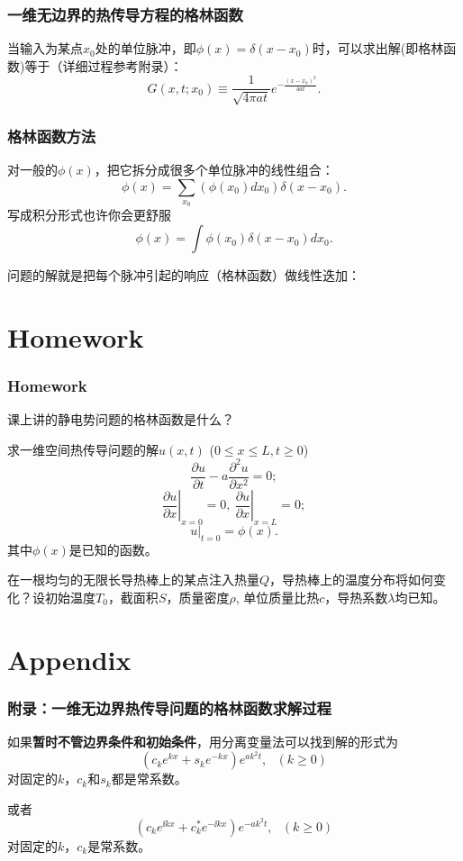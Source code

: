 \documentclass[CJK]{beamer}
\begin{document}
\begin{frame}
  \frametitle{ 一维无边界的热传导方程的格林函数}
  
  当输入为某点$x_0$处的单位脉冲，即$\phi(x) = \delta(x-x_0)$时，可以求出解(即格林函数)等于（详细过程参考附录）：
  $$ G(x, t; x_0)  \equiv \frac{1}{\sqrt{4\pi at}} e^{-\frac{(x-x_0)^2}{4at}}. $$
\end{frame}



\begin{frame}
  \frametitle{格林函数方法}

  对一般的$\phi(x)$，把它拆分成很多个单位脉冲的线性组合：
  $$ \phi(x) = \sum_{x_0} (\phi(x_0)dx_0)  \delta(x-x_0). $$
  写成积分形式也许你会更舒服
  $$\phi(x) = \int \phi(x_0) \delta(x-x_0) dx_0. $$

  问题的解就是把每个脉冲引起的响应（格林函数）做线性迭加：  
  
\end{frame}




\section{Homework}

\begin{frame}
  \frametitle{Homework}
  \bitem
\item{课上讲的静电势问题的格林函数是什么？}
\item{求一维空间热传导问题的解$u(x,t)$ ($0\le x\le L, t\ge 0$)
  $$ \frac{\partial u}{\partial t} - a\frac{\partial^2u}{\partial x^2} = 0;$$
  $$ \left.\frac{\partial u}{\partial x}\right\vert_{x=0} = 0,\ \left.\frac{\partial u}{\partial x}\right\vert_{x=L}=0; $$
  $$ \left.u\right\vert_{t=0} = \phi(x). $$
  其中$\phi(x)$是已知的函数。}
\item{在一根均匀的无限长导热棒上的某点注入热量$Q$，导热棒上的温度分布将如何变化？设初始温度$T_0$，截面积$S$，质量密度$\rho$, 单位质量比热$c$，导热系数$\lambda$均已知。}
  \eitem
\end{frame}

\section{Appendix}

\begin{frame}
  \frametitle{附录：一维无边界热传导问题的格林函数求解过程}
  
  如果{\bf 暂时不管边界条件和初始条件}，用分离变量法可以找到解的形式为
  \begin{equation}
    \left(c_k e^{k x} + s_k e^{-k x}\right) e^{ak^2t},\ \ \ (k\ge 0) \label{eq:s1}
  \end{equation}
  对固定的$k$，$c_k$和$s_k$都是常系数。

  或者
  \begin{equation}
    \left(c_k e^{\ii k x} + c_k^* e^{-\ii k x}\right) e^{- ak^2t},\ \ \ (k\ge 0) \label{eq:s2}
  \end{equation}
  对固定的$k$，$c_k$是常系数。
  
\end{frame}
\end{document}
